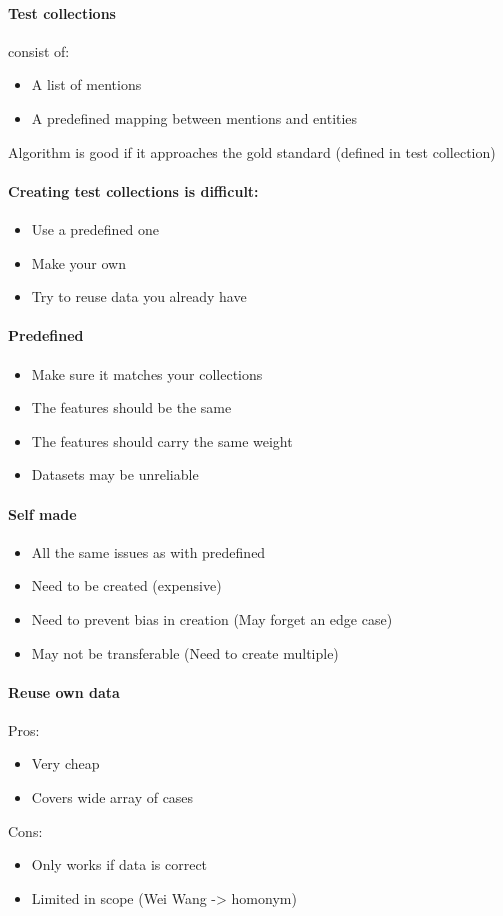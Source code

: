 \documentclass[10pt,a4paper]{scrreprt}
\begin{document}
\paragraph{Test collections}
consist of:
\begin{itemize}
	\item A list of mentions
	\item A predefined mapping between mentions and entities
\end{itemize}
Algorithm is good if it approaches the gold standard (defined in test collection)

\paragraph{Creating test collections is difficult:}
\begin{itemize}
	\item Use a predefined one
	\item Make your own
	\item Try to reuse data you already have
\end{itemize}

\paragraph{Predefined}
\begin{itemize}
	\item Make sure it matches your collections
	\item The features should be the same
	\item The features should carry the same weight
	\item Datasets may be unreliable 
\end{itemize}

\paragraph{Self made}
\begin{itemize}
	\item All the same issues as with predefined
	\item Need to be created (expensive)
	\item Need to prevent bias in creation (May forget an edge case)
	\item May not be transferable (Need to create multiple)
\end{itemize}

\paragraph{Reuse own data}
Pros:
\begin{itemize}
	\item Very cheap
	\item Covers wide array of cases
\end{itemize}
Cons:
\begin{itemize}
	\item Only works if data is correct
	\item Limited in scope (Wei Wang -> homonym)
\end{itemize}
\end{document}
